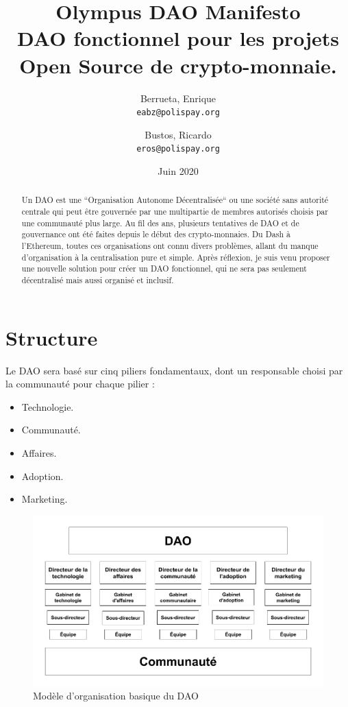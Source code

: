 \documentclass{article}
\title{%
  Olympus DAO Manifesto \\
  \large DAO fonctionnel pour les projets Open Source de crypto-monnaie.}
\author{
  Berrueta, Enrique\\
  \texttt{eabz@polispay.org}
  \and
  Bustos, Ricardo\\
  \texttt{eros@polispay.org}
}
\date{Juin 2020}
\begin{document}
\maketitle

	\begin{abstract}
    Un DAO est une ``Organisation Autonome Décentralisée`` ou une société sans autorité centrale qui peut être gouvernée par une multipartie de membres autorisés choisis par une communauté plus large. Au fil des ans, plusieurs tentatives de DAO et de gouvernance ont été faites depuis le début des crypto-monnaies. Du Dash à l'Ethereum, toutes ces organisations ont connu divers problèmes, allant du manque d'organisation à la centralisation pure et simple. Après réflexion, je suis venu proposer une nouvelle solution pour créer un DAO fonctionnel, qui ne sera pas seulement décentralisé mais aussi organisé et inclusif.
	\end{abstract}

\newpage

\tableofcontents


\newpage

\section{Structure}

Le DAO sera basé sur cinq piliers fondamentaux, dont un responsable choisi par la communauté pour chaque pilier :

\begin{itemize}
  \item Technologie.
  \item Communauté.
  \item Affaires.
  \item Adoption.
  \item Marketing.
\end{itemize}

\begin{figure}[h]
\includegraphics[scale=0.4]{img/dao_structure_fr.png}
\centering
\caption{Modèle d'organisation basique du DAO}
\end{figure}
\end{document}
